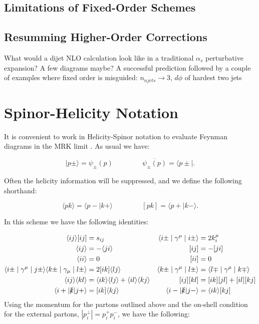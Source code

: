 	\subsection{Limitations of Fixed-Order Schemes}

	\subsection{Resumming Higher-Order Corrections}

	What would a dijet NLO calculation look like in a traditional $\alpha_s$ perturbative expansion?
	A few diagrams maybe?
	A successful prediction followed by a couple of examples where fixed order is misguided: $n_{njets}\rightarrow3$, $d\phi$ of hardest two jets

\section{Spinor-Helicity Notation}
\label{sec:SpinorHelicity}

	It is convenient to work in Helicity-Spinor notation to evaluate Feynman diagrams in the MRK limit \cite{efficiently}.  As usual we have:

	\begin{equation}
	\mid p\pm\rangle = \psi_\pm(p) \hspace{50pt} \overline{\psi_\pm(p)} = \langle p\pm\mid.
	\end{equation}

	Often the helicity information will be suppressed, and we define the following shorthand:

	\begin{equation}
	\langle pk\rangle = \langle p-\mid k+\rangle \hspace{50pt} [pk] = \langle p+\mid k-\rangle.
	\end{equation}

	In this scheme we have the following identities:

	\begin{align}
	\langle ij\rangle[ij] &= s_{ij} & \langle i\pm\mid\gamma^\mu\mid i\pm\rangle &= 2k_i^\mu \\
	\langle ij\rangle &= -\langle ji\rangle & [ij] &= -[ji] \\
	\langle ii\rangle &= 0 & [ii] &= 0 \\
	\langle i\pm\mid\gamma^\mu\mid j\pm\rangle\langle k\pm\mid\gamma_\mu\mid l\pm\rangle &= 2[ik]\langle l j\rangle & \langle k\pm\mid\gamma^\mu\mid l\pm\rangle &= \langle l\mp\mid\gamma^\mu\mid k\mp\rangle \\
	\langle i j\rangle\langle k l\rangle &= \langle i k\rangle\langle l j\rangle + \langle i l\rangle\langle k j\rangle & [ij][kl] &= [ik][jl]+[il][kj] \\
	\langle i+|\slashed k|j+\rangle &= [ik]\langle kj\rangle & \langle i-|\slashed k|j-\rangle &= \langle	 ik\rangle [kj]
	\end{align}
	Using the momentum for the partons outlined above and the on-shell condition for the external partons, $|p_i^\perp|=p_i^+p_i^-$, we have the following:

